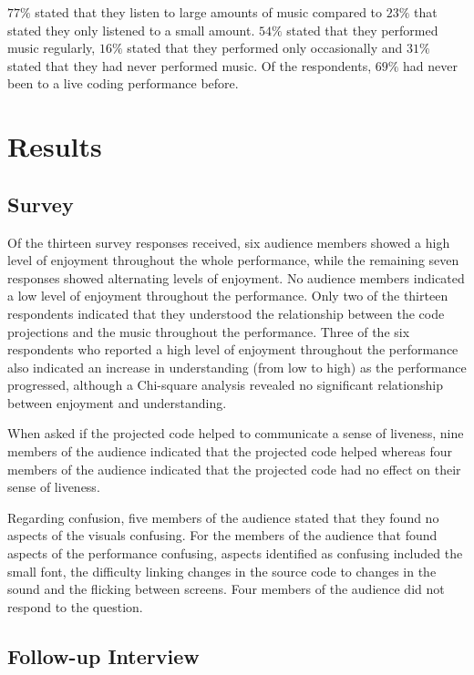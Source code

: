 $77\%$ stated that they listen to large amounts of music compared to $23\%$ that stated they only listened to a small amount. $54\%$ stated that they performed music regularly, $16\%$ stated that they performed only occasionally and $31\%$ stated that they had never performed music. Of the respondents, $69\%$ had never been to a live coding performance before.

\section{Results}

\subsection{Survey}

Of the thirteen survey responses received, six audience members showed a high level of enjoyment throughout the whole performance, while the remaining seven responses showed alternating levels of enjoyment. No audience members indicated a low level of enjoyment throughout the performance.  Only two of the thirteen respondents indicated that they understood the relationship between the code projections and the music throughout the performance. Three of the six respondents who reported a high level of enjoyment throughout the performance also indicated an increase in understanding (from low to high) as the performance progressed, although a Chi-square analysis revealed no significant relationship between enjoyment and understanding. 

When asked if the projected code helped to communicate a sense of liveness, nine members of the audience indicated that the projected code helped whereas four members of the audience indicated that the projected code had no effect on their sense of liveness.

Regarding confusion, five members of the audience stated that they found no aspects of the visuals confusing. For the members of the audience that found aspects of the performance confusing, aspects identified as confusing included the small font, the difficulty linking changes in the source code to changes in the sound and the flicking between screens. Four members of the audience did not respond to the question.

\subsection{Follow-up Interview}
\label{section:study-1-follow-up-interview}

